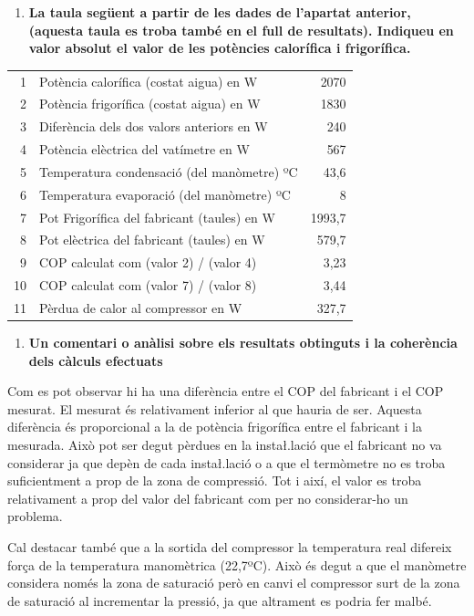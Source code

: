 \documentclass[a4paper]{article}
\begin{document}
\begin{enumerate}[resume]
	\item \textbf{La taula següent a partir de les dades de l'apartat anterior, (aquesta taula es troba també en el full de resultats). Indiqueu en valor absolut el valor de les potències calorífica i frigorífica.}
\end{enumerate}

\begin{table}[H]
	\centering
	\begin{tabular}{rl|r}
		1  & Potència calorífica (costat aigua) en W     & 2070 \\
		2  & Potència frigorífica (costat aigua) en W    & 1830 \\
		3  & Diferència dels dos valors anteriors en W   &  240 \\
		4  & Potència elèctrica del vatímetre en W       &  567 \\
		5  & Temperatura condensació (del manòmetre) ºC  &   43,6 \\
		6  & Temperatura evaporació (del manòmetre) ºC   &    8 \\
		7  & Pot Frigorífica del fabricant (taules) en W & 1993,7 \\
		8  & Pot elèctrica del fabricant (taules) en W   &  579,7 \\
		9  & COP calculat com (valor 2) / (valor 4)      &    3,23 \\
		10 & COP calculat com (valor 7) / (valor 8)      &    3,44 \\
		11 & Pèrdua de calor al compressor en W          &  327,7 \\
	\end{tabular}
\end{table}

\begin{enumerate}[resume]
	\item \textbf{Un comentari o anàlisi sobre els resultats obtinguts i la coherència dels càlculs efectuats}
\end{enumerate}

Com es pot observar hi ha una diferència entre el COP del fabricant i el COP mesurat. El mesurat és relativament inferior al que hauria de ser. Aquesta diferència és proporcional a la de potència frigorífica entre el fabricant i la mesurada. Això pot ser degut pèrdues en la insta\l.lació que el fabricant no va considerar ja que depèn de cada insta\l.lació o a que el termòmetre no es troba suficientment a prop de la zona de compressió. Tot i així, el valor es troba relativament a prop del valor del fabricant com per no considerar-ho un problema. 

Cal destacar també que a la sortida del compressor la temperatura real difereix força de la temperatura manomètrica (22,7ºC). Això és degut a que el manòmetre considera només la zona de saturació però en canvi el compressor surt de la zona de saturació al incrementar la pressió, ja que altrament es podria fer malbé.
\end{document}

